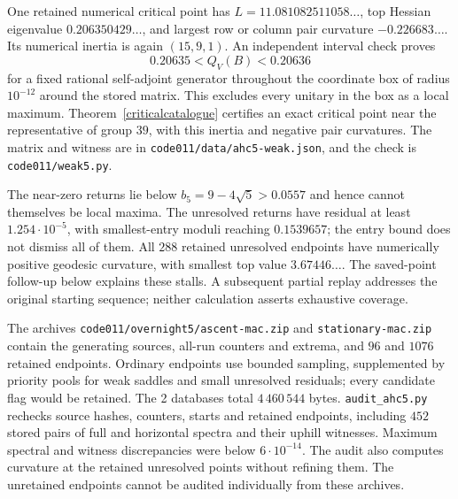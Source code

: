 \documentclass[11pt,a4paper]{article}
\begin{document}
One retained numerical critical point has $L=11.081082511058\ldots$,
top Hessian eigenvalue $0.206350429\ldots$, and largest row or column
pair curvature $-0.226683\ldots$. Its numerical inertia is again
$(15,9,1)$. An independent interval check proves
\[
 0.20635<Q_V(B)<0.20636
\]
for a fixed rational self-adjoint generator throughout the coordinate box
of radius $10^{-12}$ around the stored matrix. This excludes every
unitary in the box as a local maximum. Theorem~\ref{criticalcatalogue}
certifies an exact critical point near the representative of group $39$,
with this inertia and negative pair curvatures. The matrix and witness are in
\texttt{code011/data/ahc5-weak.json}, and the check is \texttt{code011/weak5.py}.

The near-zero returns lie below $b_5=9-4\sqrt5>0.0557$ and hence
cannot themselves be local maxima. The unresolved returns have
residual at least $1.254\cdot10^{-5}$, with smallest-entry moduli
reaching $0.1539657$; the entry bound does not dismiss all of them.
All $288$ retained unresolved endpoints have numerically positive
geodesic curvature, with smallest top value $3.67446\ldots$.
The saved-point follow-up below explains these stalls. A subsequent
partial replay addresses the original starting sequence; neither
calculation asserts exhaustive coverage.

The archives \texttt{code011/overnight5/ascent-mac.zip} and
\texttt{stationary-mac.zip} contain the generating sources, all-run
counters and extrema, and $96$ and $1076$ retained endpoints. Ordinary
endpoints use bounded sampling, supplemented by priority pools for weak
saddles and small unresolved residuals; every candidate flag would be
retained. The 2 databases total $4\,460\,544$ bytes.
\texttt{audit\_ahc5.py} rechecks source hashes, counters, starts and
retained endpoints, including $452$ stored pairs of full and horizontal
spectra and their uphill witnesses. Maximum spectral and witness
discrepancies were below $6\cdot10^{-14}$. The audit also computes
curvature at the retained unresolved points without refining them.
The unretained endpoints cannot be audited individually from these archives.
\end{document}
